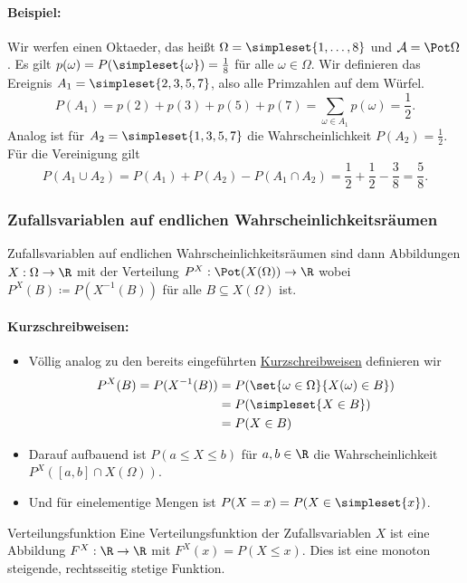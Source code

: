 \paragraph{Beispiel:}
Wir werfen einen Oktaeder, das heißt $\Omega=\simpleset{1,\ldots,8}$ und $\mathcal A=\Pot \Omega$. Es gilt $p(\omega)=P(\simpleset{\omega})=\frac 18$ für alle $\omega \in\Omega$. Wir definieren das Ereignis $A_1=\simpleset{2,3,5,7}$, also alle Primzahlen auf dem Würfel.
\begin{equation*}
	P(A_1)=p(2)+p(3)+p(5)+p(7)=\sum_{\omega\in A_1}p(\omega)=\frac12.
\end{equation*}
Analog ist für $A_2=\simpleset{1,3,5,7}$ die Wahrscheinlichkeit $P(A_2)=\frac12$. Für die Vereinigung gilt
\begin{equation*}
	P(A_1\cup A_2)=P(A_1)+P(A_2)-P(A_1\cap A_2)=\frac12+\frac12-\frac38=\frac58.
\end{equation*}

\subsubsection{Zufallsvariablen auf endlichen Wahrscheinlichkeitsräumen}
Zufallsvariablen auf endlichen Wahrscheinlichkeitsräumen sind dann Abbildungen $X:\Omega \rightarrow \R$ mit der Verteilung $P^X:\Pot(X(\Omega))\rightarrow \R$ wobei $P^X(B)\coloneqq P(X^{-1}(B))$ für alle $B\subseteq X(\Omega)$ ist.
\paragraph{Kurzschreibweisen:}
\begin{itemize}
	\item Völlig analog zu den bereits eingeführten \hyperref[Kurzschreibweisen1]{Kurzschreibweisen} definieren wir
		\begin{align*}
		    P^X(B)=P(X^{-1}(B))&=P(\set{\omega\in\Omega}{X(\omega)\in B})\\
		    &=P(\simpleset{X\in B})\\
		    &=P(X\in B)
		\end{align*}
	\item Darauf aufbauend ist $P(a\leq X\leq b)$ für $a,b\in\R$ die Wahrscheinlichkeit $P^X([a,b]\cap X(\Omega))$.
	\item Und für einelementige Mengen ist $P(X=x)=P(X\in \simpleset{x})$.
\end{itemize}

\begin{definition}{Verteilungsfunktion}
	Eine Verteilungsfunktion der Zufallsvariablen $X$ ist eine Abbildung $F^X:\R\rightarrow\R$ mit $F^X(x)=P(X\leq x)$. Dies ist eine monoton steigende, rechtsseitig stetige Funktion.
\end{definition}


